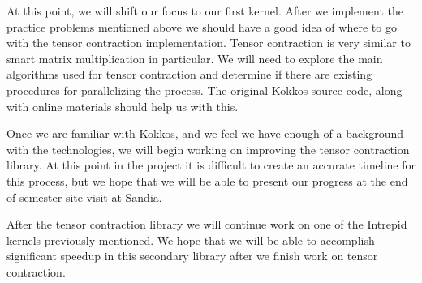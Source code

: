 \documentclass[proposal]{hmcclinic}
\begin{document}
At this point, we will shift our focus to our first kernel.
After we implement the practice problems mentioned above we should have a good
idea of where to go with the tensor contraction implementation. Tensor contraction is very
similar to smart matrix multiplication in particular.  We will need to explore the main
algorithms used for tensor contraction and determine if there are existing
procedures for parallelizing the process. The original Kokkos source code,
along with online materials should help us with this.

Once we are familiar with Kokkos, and we feel we have enough of a background
with the technologies, we will begin working on improving the tensor
contraction library. At this point in the project it is difficult to create an accurate timeline
for this process, but we hope that we will be able to present our progress at 
the end of semester site visit at Sandia.

After the tensor contraction library we will continue work on one of the Intrepid kernels previously mentioned. We hope that we will be able to accomplish significant speedup in
this secondary library after we finish work on tensor contraction. 







\end{document}

